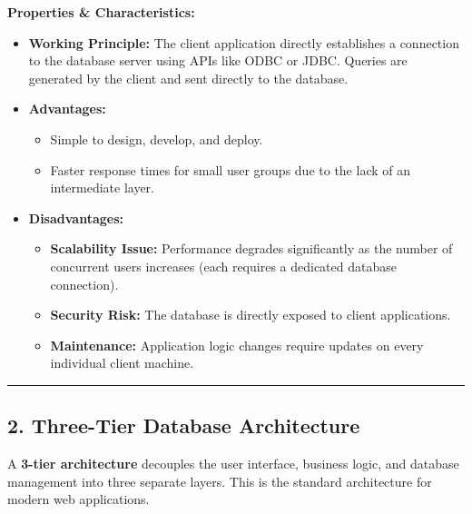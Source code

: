 \documentclass[12pt,a3paper]{article}
\begin{document}
\begin{enumerate}
\begin{tcolorbox}[enhanced,breakable,ansbox,colback=cA!4,colframe=cA,boxrule=0.8pt,arc=5pt,title={\textbf{Answer}},fonttitle=\bfseries\color{white},colbacktitle=cA]
\textbf{Properties \& Characteristics:}
\begin{itemize}
    \item \textbf{Working Principle:} The client application directly establishes a connection to the database server using APIs like ODBC or JDBC. Queries are generated by the client and sent directly to the database.
    \item \textbf{Advantages:} 
        \begin{itemize}
            \item Simple to design, develop, and deploy.
            \item Faster response times for small user groups due to the lack of an intermediate layer.
        \end{itemize}
    \item \textbf{Disadvantages:} 
        \begin{itemize}
            \item \textbf{Scalability Issue:} Performance degrades significantly as the number of concurrent users increases (each requires a dedicated database connection).
            \item \textbf{Security Risk:} The database is directly exposed to client applications.
            \item \textbf{Maintenance:} Application logic changes require updates on every individual client machine.
        \end{itemize}
\end{itemize}

\vspace{1em}
\hrule
\vspace{1em}

\subsection*{2. Three-Tier Database Architecture}

A \textbf{3-tier architecture} decouples the user interface, business logic, and database management into three separate layers. This is the standard architecture for modern web applications.


\end{tcolorbox}
\end{enumerate}
\end{document}
